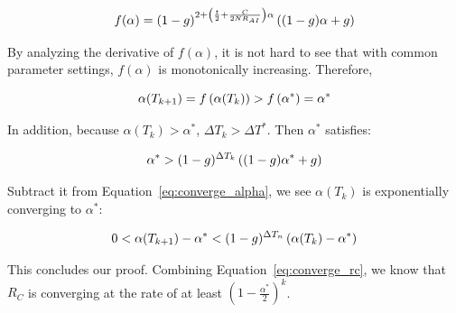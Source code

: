 \begin{equation}
\small
f(\alpha ) = {(1 - g)^{2 + \left( {\frac{t}{2} + \frac{C}{{2N{R_{AI}}}}} \right)\alpha }}\left( {(1 - g)\alpha  + g} \right)
\end{equation}

By analyzing the derivative of $f(\alpha )$, it is not hard to see that with common parameter 
settings, $f(\alpha )$ is monotonically increasing. Therefore, 

\begin{equation}
\small
\alpha ({T_{k + 1}}) = f\left( {\alpha ({T_k})} \right) > f\left( {{\alpha ^*}} \right) = {\alpha ^*}
\end{equation}

In addition, because $\alpha ({T_k}) > {\alpha ^*}$, $\Delta {T_k} > \Delta {T^*}$. 
Then $\alpha^{*}$ satisfies:

\begin{equation}
\small
{\alpha ^*} > {(1 - g)^{\Delta {T_k}}}\left( {(1 - g){\alpha ^*} + g} \right)
\end{equation}

Subtract it from Equation~\ref{eq:converge_alpha}, we see $\alpha ({T_k})$ is exponentially 
converging to $\alpha ^*$:

\begin{equation}
\small
0 < \alpha ({T_{k + 1}}) - {\alpha ^*} < {(1 - g)^{\Delta {T_n}}}\left( {\alpha ({T_k}) - {\alpha ^*}} \right)
\end{equation}

This concludes our proof. Combining Equation~\ref{eq:converge_rc}, we know that $R_C$ is 
converging at the rate of at least $( {1 - \frac{{{\alpha ^{*}}}}{2}} )^k$.

